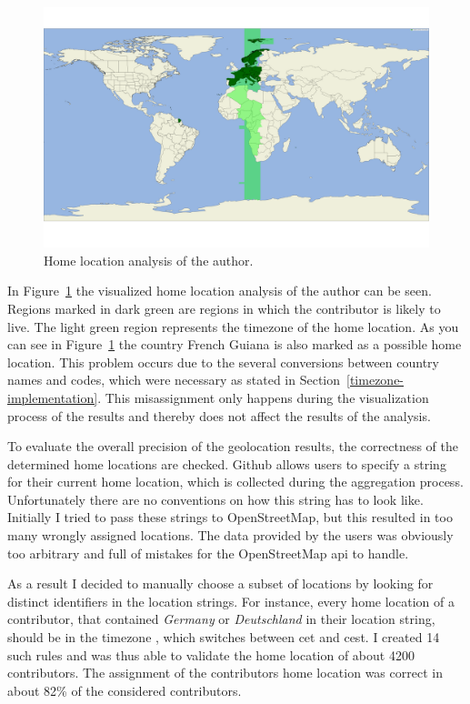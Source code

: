 \begin{figure}[H]
    \includegraphics[scale=0.10]{./graphs/analysis/author-home-location}
    \centering
    \caption{Home location analysis of the author.}\label{fig:author-home-location}
\end{figure}

In Figure~\ref{fig:author-home-location} the visualized home location analysis of the author can be seen.
Regions marked in dark green are regions in which the contributor is likely to live.
The light green region represents the timezone of the home location.
As you can see in Figure~\ref{fig:author-home-location} the country French Guiana is also marked as a possible home location.
This problem occurs due to the several conversions between country names and codes, which were necessary as stated in Section~\ref{timezone-implementation}.
This misassignment only happens during the visualization process of the results and thereby does not affect the results of the analysis.

To evaluate the overall precision of the geolocation results, the correctness of the determined home locations are checked.
Github allows users to specify a string for their current home location, which is collected during the aggregation process.
Unfortunately there are no conventions on how this string has to look like.
Initially I tried to pass these strings to OpenStreetMap, but this resulted in too many wrongly assigned locations.
The data provided by the users was obviously too arbitrary and full of mistakes for the OpenStreetMap \ac{api} to handle.

As a result I decided to manually choose a subset of locations by looking for distinct identifiers in the location strings.
For instance, every home location of a contributor, that contained \emph{Germany} or \emph{Deutschland} in their location string, should be in the  timezone , which switches between \ac{cet} and \ac{cest}.
I created 14 such rules and was thus able to validate the home location of about 4200 contributors.
The assignment of the contributors home location was correct in about 82\% of the considered contributors.

